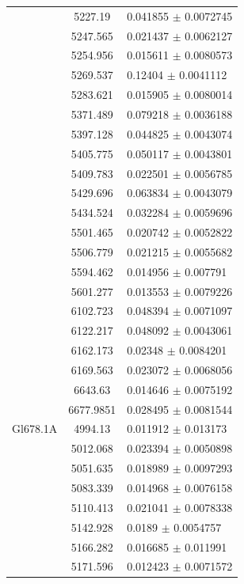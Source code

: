 \begin{longtable}{|c|c|l|}
 & 5227.19 & 0.041855 $\pm$ 0.0072745 \\        
 & 5247.565 & 0.021437 $\pm$ 0.0062127 \\       
 & 5254.956 & 0.015611 $\pm$ 0.0080573 \\       
 & 5269.537 & 0.12404 $\pm$ 0.0041112 \\        
 & 5283.621 & 0.015905 $\pm$ 0.0080014 \\       
 & 5371.489 & 0.079218 $\pm$ 0.0036188 \\       
 & 5397.128 & 0.044825 $\pm$ 0.0043074 \\       
 & 5405.775 & 0.050117 $\pm$ 0.0043801 \\       
 & 5409.783 & 0.022501 $\pm$ 0.0056785 \\       
 & 5429.696 & 0.063834 $\pm$ 0.0043079 \\       
 & 5434.524 & 0.032284 $\pm$ 0.0059696 \\       
 & 5501.465 & 0.020742 $\pm$ 0.0052822 \\       
 & 5506.779 & 0.021215 $\pm$ 0.0055682 \\       
 & 5594.462 & 0.014956 $\pm$ 0.007791 \\        
 & 5601.277 & 0.013553 $\pm$ 0.0079226 \\       
 & 6102.723 & 0.048394 $\pm$ 0.0071097 \\       
 & 6122.217 & 0.048092 $\pm$ 0.0043061 \\       
 & 6162.173 & 0.02348 $\pm$ 0.0084201 \\        
 & 6169.563 & 0.023072 $\pm$ 0.0068056 \\       
 & 6643.63 & 0.014646 $\pm$ 0.0075192 \\        
 & 6677.9851 & 0.028495 $\pm$ 0.0081544 \\      
\hline                                          
Gl678.1A & 4994.13 & 0.011912 $\pm$ 0.013173 \\ 
 & 5012.068 & 0.023394 $\pm$ 0.0050898 \\       
 & 5051.635 & 0.018989 $\pm$ 0.0097293 \\       
 & 5083.339 & 0.014968 $\pm$ 0.0076158 \\       
 & 5110.413 & 0.021041 $\pm$ 0.0078338 \\       
 & 5142.928 & 0.0189 $\pm$ 0.0054757 \\         
 & 5166.282 & 0.016685 $\pm$ 0.011991 \\        
 & 5171.596 & 0.012423 $\pm$ 0.0071572 \\       

\end{longtable}
